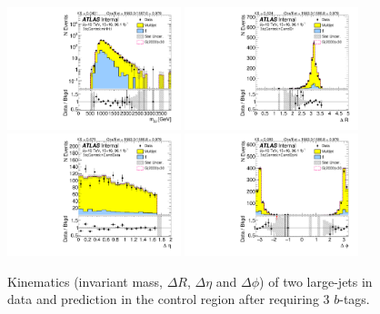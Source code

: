 \begin{figure}[htbp!]
\begin{center}
\includegraphics[width=0.45\textwidth,angle=-90]{figures/boosted/Control/b77_ThreeTag_Control_mHH_l_1.pdf}
\includegraphics[width=0.45\textwidth,angle=-90]{figures/boosted/Control/b77_ThreeTag_Control_hCandDr.pdf}\\
\includegraphics[width=0.45\textwidth,angle=-90]{figures/boosted/Control/b77_ThreeTag_Control_hCandDeta.pdf}
\includegraphics[width=0.45\textwidth,angle=-90]{figures/boosted/Control/b77_ThreeTag_Control_hCandDphi.pdf}
  \caption{Kinematics (invariant mass, $\Delta R$, $\Delta \eta$ and $\Delta \phi$) of two large-\R jets in data and prediction in the control region after requiring 3 $b$-tags.  }
  \label{fig:boosted-3b-control-ak10-system}
\end{center}
\end{figure}

